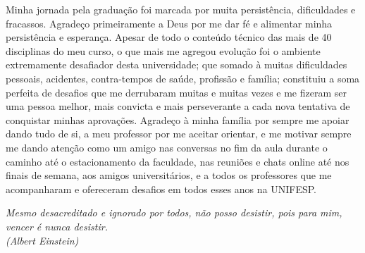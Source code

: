 \documentclass[	12pt, Times, openright, twoside, a4paper, english, brazil]{abntex2}
\begin{document}
    \begin{agradecimentos}
    Minha jornada pela graduação foi marcada por muita persistência, dificuldades e fracassos. Agradeço primeiramente a Deus por me dar fé e alimentar minha persistência e esperança. Apesar de todo o conteúdo técnico das mais de 40 disciplinas do meu curso, o que mais me agregou evolução foi o ambiente extremamente desafiador desta universidade; que somado à muitas dificuldades pessoais, acidentes, contra-tempos de saúde, profissão e família; constituiu a soma perfeita de desafios que me derrubaram muitas e muitas vezes e me fizeram ser uma pessoa melhor, mais convicta e mais perseverante a cada nova tentativa de conquistar minhas aprovações. Agradeço à minha família por sempre me apoiar dando tudo de si, a meu professor por me aceitar orientar, e me motivar sempre me dando atenção como um amigo nas conversas no fim da aula durante o caminho até o estacionamento da faculdade, nas reuniões e chats online até nos finais de semana, aos amigos universitários, e a todos os professores que me acompanharam e ofereceram desafios em todos esses anos na UNIFESP. 

    \end{agradecimentos}

    \begin{epigrafe}
        \vspace*{\fill}
    	\begin{flushright}
    		\textit{Mesmo desacreditado e ignorado por todos, não posso desistir, pois para mim, vencer é nunca desistir.\\
    		(Albert Einstein)}
    	\end{flushright}
    \end{epigrafe}

\end{document}
